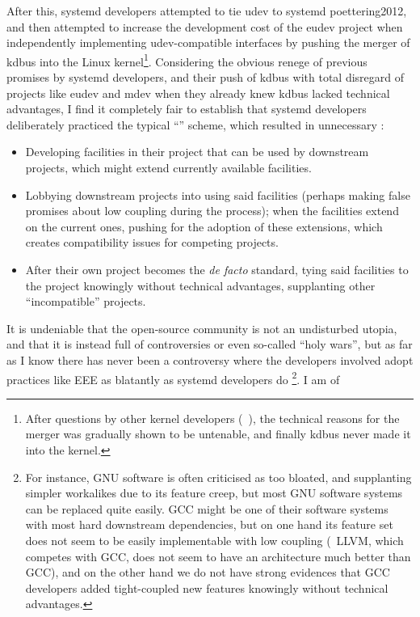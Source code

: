 After this, systemd developers attempted to tie udev to systemd\cupercite%
{poettering2012}, and then attempted to increase the development cost of the
eudev project when independently implementing udev-compatible interfaces%
 by pushing the merger of kdbus into the Linux
kernel\footnote{After questions by other kernel developers (\eg~\parencite%
{lutomirski2015}), the technical reasons for the merger
was gradually shown to be untenable, and finally kdbus never made it into the
kernel.}.  Considering the obvious renege of previous promises by systemd
developers, and their push of kdbus
with total disregard of projects like eudev and mdev when they already knew
kdbus lacked technical advantages, I find it completely
fair to establish that systemd developers deliberately practiced the typical
``'' scheme,
which resulted in unnecessary :
\begin{itemize}
\item Developing facilities in their project that can be used by downstream
	projects, which might extend currently available facilities.
\item Lobbying downstream projects into using said facilities (perhaps making
	false promises about low coupling during the process); when the facilities
	extend on the current ones, pushing for the adoption of these extensions,
	which creates compatibility issues for competing projects.
\item After their own project becomes the \emph{de facto} standard, tying
	said facilities to the project knowingly without technical advantages,
	supplanting other ``incompatible'' projects.
\end{itemize}
It is undeniable that the open-source community is not an undisturbed utopia,
and that it is instead full of controversies or even so-called ``holy wars'',
but as far as I know there has never been a controversy where the developers
involved adopt practices like EEE as blatantly as systemd developers do%
\footnote{For instance, GNU software is often criticised as too bloated, and
supplanting simpler workalikes due to its feature creep, but most GNU software
systems can be replaced quite easily.  GCC might be one of their software
systems with most hard downstream dependencies, but on one hand its feature set
does not seem to be easily implementable with low coupling (\eg~LLVM, which
competes with GCC, does not seem to have an architecture much better than GCC),
and on the other hand we do not have strong evidences that GCC developers added
tight-coupled new features knowingly without technical advantages.}.  I am of
